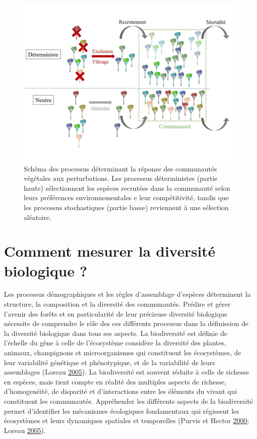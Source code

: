 \documentclass[11pt,french,A4paper,extrafontsizes,onecolumn,openright]{memoir}
\begin{document}
\begin{figure}

{\centering \includegraphics[width=1\linewidth]{ExternalFig/Fig_AssemblyRules} 

}

\caption{Schéma des processus déterminant la réponse des communautés végétales aux perturbations. Les processus déterministes (partie haute) sélectionnent les espèces recrutées dans la communauté selon leurs préférences environnementales e leur compétitivité, tandis que les processus stochastiques (partie basse) reviennent à une sélection aléatoire.}\label{fig:AssemblyRules}
\end{figure}

\section{Comment mesurer la diversité biologique
?}\label{comment-mesurer-la-diversite-biologique}

Les processus démographiques et les règles d'assemblage d'espèces
déterminent la structure, la composition et la diversité des
communautés. Prédire et gérer l'avenir des forêts et en particularité de
leur précieuse diversité biologique nécessite de comprendre le rôle des
ces différents processus dans la définission de la diversité biologique
dans tous ses aspects. La biodiversité est définie de l'échelle du gène
à celle de l'écosystème considère la diversité des plantes, animaux,
champignons et microorganismes qui constituent les écosystèmes, de leur
variabilité génétique et phénotypique, et de la variabilité de leurs
assemblages (Loreau \protect\hyperlink{ref-Loreau2005}{2005}). La
biodiversité est souvent réduite à celle de richesse en espèces, mais
tient compte en réalité des multiples aspects de richesse,
d'homogenéité, de disparité et d'interactions entre les éléments du
vivant qui constituent les communautés. Appréhender les différents
aspects de la biodiversité permet d'identifier les mécanismes
écologiques fondamentaux qui régissent les écosystèmes et leurs
dynamiques spatiales et temporelles (Purvis et Hector
\protect\hyperlink{ref-Purvis2000}{2000}; Loreau
\protect\hyperlink{ref-Loreau2005}{2005}).
\end{document}
